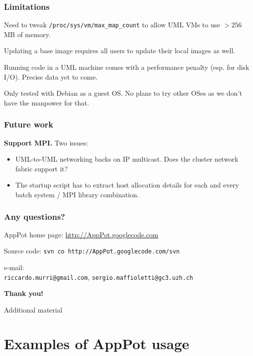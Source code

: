 \documentclass{beamer}
\begin{document}
\begin{frame}
  \frametitle{Limitations}
  \label{sec:20}
  Need to tweak \texttt{/proc/sys/vm/max\_map\_count} to allow UML VMs
  to use $>256$MB of memory.

  \+
  Updating a base image requires all users to update their local
  images as well.

  \+
  Running code in a UML machine comes with a performance penalty
  (esp. for disk I/O).  Precise data yet to come.

  \+
  Only tested with Debian as a guest OS.  No plans to try other OSes
  as we don't have the manpower for that.
  \end{frame}


\begin{frame}
  \frametitle{Future work}
  \label{sec:21}
  \textbf{Support MPI.}  Two issues:
  \begin{itemize}
  \item UML-to-UML networking backs on IP multicast. Does the cluster
    network fabric support it?
  \item The startup script has to extract host allocation details
    for each and every batch system / MPI library combination.
  \end{itemize}
\end{frame}


\begin{frame}
  \frametitle{Any questions?}
  \label{sec:23}
  \begin{center}
    AppPot home page: \href{http://AppPot.googlecode.com}{http://AppPot.googlecode.com}

    \+
    Source code: \texttt{svn co http://AppPot.googlecode.com/svn}
    
    \+
    e-mail: \\ 
    \texttt{riccardo.murri@gmail.com}, \texttt{sergio.maffioletti@gc3.uzh.ch}
    
    \+
    \textbf{Thank you!}
  \end{center}
\end{frame}


\appendix
\begin{frame}
  \begin{center}
    {\Huge Additional material}
  \end{center}
\end{frame}

\section{Examples of AppPot usage}
\end{document}
